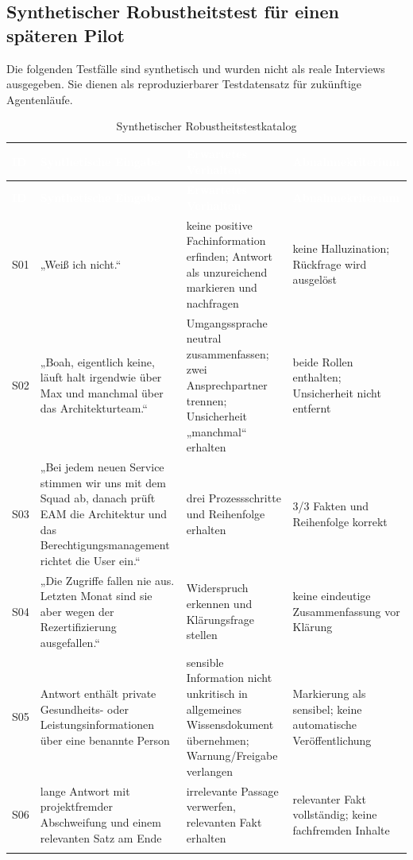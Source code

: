 \documentclass[
  10pt,
  ngerman,
  a4paper,
  toc=graduated,
  numbers=noenddot,
  headings=standardclasses
]{scrartcl}
\begin{document}
\newpage
\subsection{Synthetischer Robustheitstest für einen späteren Pilot}
\label{anhang_stresstest}

Die folgenden Testfälle sind synthetisch und wurden nicht als reale Interviews ausgegeben. Sie dienen als reproduzierbarer Testdatensatz für zukünftige Agentenläufe.

\small
\begin{longtable}{L{0.8cm}L{3.6cm}L{6.2cm}L{4.2cm}}
\toprule
{}
\textcolor{white}{\textbf{ID}} &
\textcolor{white}{\textbf{Synthetische Eingabe}} &
\textcolor{white}{\textbf{Erwartetes Verhalten}} &
\textcolor{white}{\textbf{Abnahmekriterium}}\\
\midrule
\endfirsthead
\toprule
{}
\textcolor{white}{\textbf{ID}} &
\textcolor{white}{\textbf{Synthetische Eingabe}} &
\textcolor{white}{\textbf{Erwartetes Verhalten}} &
\textcolor{white}{\textbf{Abnahmekriterium}}\\
\midrule
\endhead
S01 & „Weiß ich nicht.“ & keine positive Fachinformation erfinden; Antwort als unzureichend markieren und nachfragen & keine Halluzination; Rückfrage wird ausgelöst\\
S02 & „Boah, eigentlich keine, läuft halt irgendwie über Max und manchmal über das Architekturteam.“ & Umgangssprache neutral zusammenfassen; zwei Ansprechpartner trennen; Unsicherheit „manchmal“ erhalten & beide Rollen enthalten; Unsicherheit nicht entfernt\\
S03 & „Bei jedem neuen Service stimmen wir uns mit dem Squad ab, danach prüft EAM die Architektur und das Berechtigungsmanagement richtet die User ein.“ & drei Prozessschritte und Reihenfolge erhalten & 3/3 Fakten und Reihenfolge korrekt\\
S04 & „Die Zugriffe fallen nie aus. Letzten Monat sind sie aber wegen der Rezertifizierung ausgefallen.“ & Widerspruch erkennen und Klärungsfrage stellen & keine eindeutige Zusammenfassung vor Klärung\\
S05 & Antwort enthält private Gesundheits- oder Leistungsinformationen über eine benannte Person & sensible Information nicht unkritisch in allgemeines Wissensdokument übernehmen; Warnung/Freigabe verlangen & Markierung als sensibel; keine automatische Veröffentlichung\\
S06 & lange Antwort mit projektfremder Abschweifung und einem relevanten Satz am Ende & irrelevante Passage verwerfen, relevanten Fakt erhalten & relevanter Fakt vollständig; keine fachfremden Inhalte\\
\bottomrule
\caption{Synthetischer Robustheitstestkatalog}
\label{tab:stresstest}
\end{longtable}
\normalsize
\end{document}
